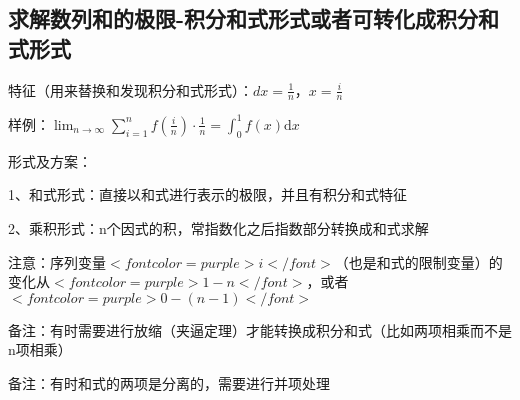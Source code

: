 \subsection{求解数列和的极限-积分和式形式或者可转化成积分和式形式}

特征（用来替换和发现积分和式形式）：$ dx=\frac{1}{n} $，$ x=\frac{i}{n} $

样例：$ \lim _{n \rightarrow \infty} \sum_{i=1}^{n} f\left(\frac{i}{n}\right) \cdot \frac{1}{n}=\int_{0}^{1} f(x) \mathrm{d} x $

形式及方案：

1、和式形式：直接以和式进行表示的极限，并且有积分和式特征

2、乘积形式：n个因式的积，常指数化之后指数部分转换成和式求解

注意：序列变量$ <font color=purple>i</font> $（也是和式的限制变量）的变化从$ <font color=purple>1-n</font> $，或者$ <font color=purple>0-(n-1)</font> $

备注：有时需要进行放缩（夹逼定理）才能转换成积分和式（比如两项相乘而不是n项相乘）

备注：有时和式的两项是分离的，需要进行并项处理



